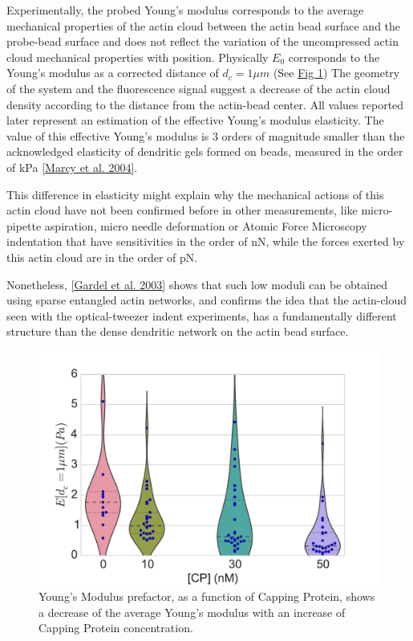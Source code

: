 \documentclass[A4paperpaper,11pt,english]{sphinxmanual}
\begin{document}
Experimentally, the probed Young's modulus corresponds to the average mechanical
properties of the actin cloud between the actin bead surface and the
probe-bead surface and does not reflect the variation of the uncompressed actin cloud mechanical
properties with position.
Physically \(E_0\) corresponds to the Young's modulus as a corrected distance of \(d_c = 1 \mu{}m\)
(See \hyperref[index-latex:ev]{Fig  \ref*{index-latex:ev}})
The geometry of the
system and the fluorescence signal suggest a decrease of the actin cloud density according to the distance from the actin-bead center. All values
reported later represent an estimation of the effective Young’s modulus elasticity. The value of this effective Young's modulus is 3 orders of magnitude
smaller than the acknowledged elasticity of dendritic gels formed on beads, measured in the
order of kPa {\hyperref[index-latex:marcy2004]{{[}Marcy et al. 2004{]}}}.

This difference in elasticity might explain why the mechanical actions of this actin cloud have not been
confirmed before in other measurements, like micro-pipette aspiration,
micro needle deformation or Atomic Force Microscopy indentation that have
sensitivities in the order of nN, while the forces exerted by this actin cloud
are in the order of pN.

Nonetheless, {\hyperref[index-latex:gardel2003]{{[}Gardel et al. 2003{]}}} shows that such low moduli can be obtained using
sparse entangled actin networks, and confirms the idea that the actin-cloud seen
with the optical-tweezer indent experiments, has a fundamentally different
structure than the dense dendritic network on the actin
bead surface.
\begin{figure}[htbp]
\centering
\capstart

\includegraphics[width=0.800\linewidth]{E0_violin.pdf}
\caption{Young's Modulus prefactor, as a function of Capping Protein, shows a decrease of the
average Young's modulus with an increase of Capping Protein concentration.}\label{index-latex:ev}\end{figure}
\end{document}
